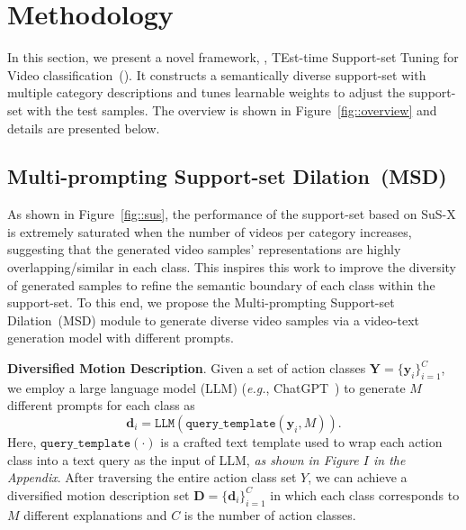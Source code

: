 \section{Methodology}
{In this section, we present a novel framework, \ie, TEst-time Support-set Tuning for Video classification~(\testv). It constructs a semantically diverse support-set with multiple category descriptions and tunes learnable weights to adjust the support-set with the test samples. The overview is shown in Figure~\ref{fig::overview} and details are presented below.}


\subsection{Multi-prompting Support-set  Dilation~(MSD)}\label{sec::MSD}
{As shown in Figure~\ref{fig::sus}, the performance of the support-set based on SuS-X is extremely saturated when the number of videos per category increases, suggesting that the generated video samples' representations are highly overlapping/similar in each class. This inspires this work to improve the diversity of generated samples to refine the semantic boundary of each class within the support-set. To this end, we propose the Multi-prompting Support-set Dilation~(MSD) module to generate diverse video samples via a video-text generation model with different prompts.}

\noindent\textbf{Diversified Motion Description}.
Given a set of action classes $\bm{Y}=\{\bm{y}_i\}_{i=1}^C$, we employ a large language model (LLM) (\emph{e.g.}, ChatGPT~\cite{ChatGPT}) to generate ${M}$ different prompts for each class as
\begin{equation}\label{eq::LLM}
\bm{d}_i = \texttt{LLM}(\texttt{query\_template}(\bm{y}_i,M)). 
\end{equation} 
Here, $\texttt{query\_template}(\cdot)$ is a crafted text template used to wrap each action class into a text query as the input of LLM, \textit{as shown in Figure $I$ in the Appendix}. After traversing the entire action class set $Y$, we can achieve a diversified motion description set $\bm{D}=\{\bm d_{i}\}_{i=1}^C$ in which each class corresponds to $M$ different explanations and $C$ is the number of action classes.

